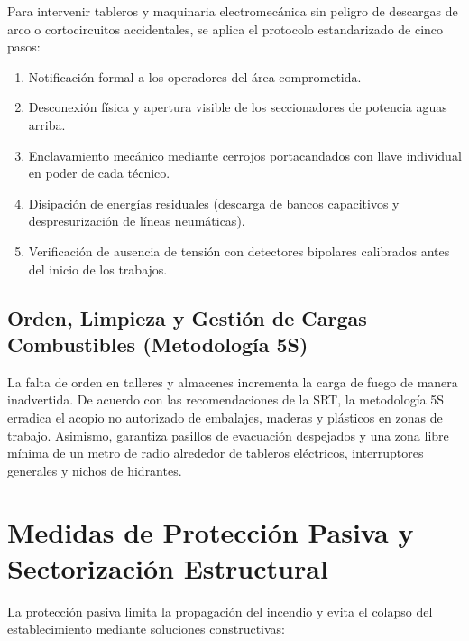Para intervenir tableros y maquinaria electromecánica sin peligro de descargas de arco o cortocircuitos accidentales, se
aplica el protocolo estandarizado de cinco pasos:
\begin{enumerate}
    \item Notificación formal a los operadores del área comprometida.
    \item Desconexión física y apertura visible de los seccionadores de potencia aguas arriba.
    \item Enclavamiento mecánico mediante cerrojos portacandados con llave individual en poder de cada técnico.
    \item Disipación de energías residuales (descarga de bancos capacitivos y despresurización de líneas neumáticas).
    \item Verificación de ausencia de tensión con detectores bipolares calibrados antes del inicio de los trabajos.
\end{enumerate}

\subsection{Orden, Limpieza y Gestión de Cargas Combustibles (Metodología 5S)}

La falta de orden en talleres y almacenes incrementa la carga de fuego de manera inadvertida. De acuerdo con las
recomendaciones de la SRT, la metodología 5S erradica el acopio no autorizado de embalajes, maderas y plásticos en zonas
de trabajo. Asimismo, garantiza pasillos de evacuación despejados y una zona libre mínima de un metro de radio alrededor
de tableros eléctricos, interruptores generales y nichos de hidrantes.

\section{Medidas de Protección Pasiva y Sectorización Estructural}
\label{sec.cap7:proteccion_pasiva}

La protección pasiva limita la propagación del incendio y evita el colapso del establecimiento mediante soluciones
constructivas:


